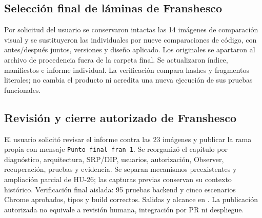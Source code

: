 \subsection{Selección final de láminas de Franshesco}
Por solicitud del usuario se conservaron intactas las 14 imágenes de comparación visual y se sustituyeron las individuales por nueve comparaciones de código, con antes/después juntos, versiones y diseño aplicado. Los originales se apartaron al archivo de procedencia fuera de la carpeta final. Se actualizaron índice, manifiestos e informe individual. La verificación compara hashes y fragmentos literales; no cambia el producto ni acredita una nueva ejecución de sus pruebas funcionales.

\subsection{Revisión y cierre autorizado de Franshesco}
El usuario solicitó revisar el informe contra las 23 imágenes y publicar la rama propia con mensaje \texttt{Punto final fran 1}. Se reorganizó el capítulo por diagnóstico, arquitectura, SRP/DIP, usuarios, autorización, Observer, recuperación, pruebas y evidencia. Se separan mecanismos preexistentes y ampliación parcial de HU-26; las capturas previas conservan su contexto histórico. Verificación final aislada: 95 pruebas backend y cinco escenarios Chrome aprobados, tipos y build correctos. Salidas y alcance en . La publicación autorizada no equivale a revisión humana, integración por PR ni despliegue.
